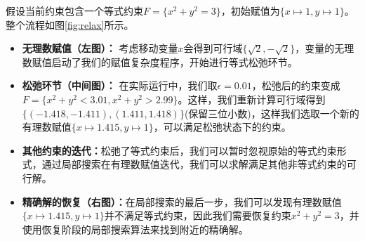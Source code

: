 \begin{example}

假设当前约束包含一个等式约束$F = \{x^2 + y^2 = 3\}$，初始赋值为$\{x \mapsto 1, y \mapsto 1\}$。整个流程如图\ref{fig:relax}所示。
\begin{itemize}
    \item \textbf{无理数赋值（左图）：} 考虑移动变量$x$会得到可行域$\{\sqrt{2}, -\sqrt{2}\}$，变量的无理数赋值启动了我们的赋值复杂度程序，开始进行等式松弛环节。
    \item \textbf{松弛环节（中间图）：} 在实际运行中，我们取$\epsilon = 0.01$，松弛后的约束变成$F = \{x^2 + y^2 < 3.01, x^2 + y^2 > 2.99\}$。这样，我们重新计算可行域得到$\{(-1.418, -1.411), (1.411, 1.418)\}$(保留三位小数)，这样我们选取一个新的有理数赋值$\{x \mapsto 1.415, y \mapsto 1\}$，可以满足松弛状态下的约束。
    \item \textbf{其他约束的迭代：}松弛了等式约束后，我们可以暂时忽视原始的等式约束形式，通过局部搜索在有理数赋值迭代，我们可以求解满足其他非等式约束的可行解。
    \item \textbf{精确解的恢复（右图）：}在局部搜索的最后一步，我们可以发现有理数赋值$\{x \mapsto 1.415, y \mapsto 1\}$并不满足等式约束，因此我们需要恢复约束$x^2 + y^2 = 3$，并使用恢复阶段的局部搜索算法来找到附近的精确解。
\end{itemize}
\label{ex:relax}    
\end{example}






